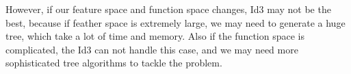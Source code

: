 \noindent However, if our feature space and function space changes, Id3 may not be the best, because if feather space is extremely large, we may need to generate a huge tree, which take a lot of time and memory. Also if the function space is complicated, the Id3 can not handle this case, and we may need more sophisticated tree algorithms to tackle the problem.




